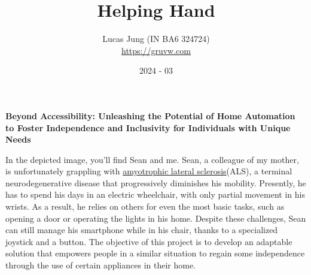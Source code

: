 \documentclass[12pt, a4paper, openany]{article}
\title{Helping Hand}
\author{Lucas Jung (IN BA6 324724)\\\url{https://gruvw.com}}
\date{2024 - 03}
\begin{document}
\maketitle
\thispagestyle{fancy}

\begin{center}
    \textbf{Beyond Accessibility: Unleashing the Potential of Home Automation to Foster Independence and Inclusivity for Individuals with Unique Needs}
\end{center}

\vspace{10pt}

\begin{minipage}[t]{0.65\textwidth}
    In the depicted image, you'll find Sean and me.
    Sean, a colleague of my mother, is unfortunately grappling with \href{https://en.wikipedia.org/wiki/ALS}{amyotrophic lateral sclerosis}\footnotemark (ALS), a terminal neurodegenerative disease that progressively diminishes his mobility.
    Presently, he has to spend his days in an electric wheelchair, with only partial movement in his wrists.
    As a result, he relies on others for even the most basic tasks, such as opening a door or operating the lights in his home.
    Despite these challenges, Sean can still manage his smartphone while in his chair, thanks to a specialized joystick and a button.
    The objective of this project is to develop an adaptable solution that empowers people in a similar situation to regain some independence through the use of certain appliances in their home.
\end{minipage}\hfill
\end{document}
